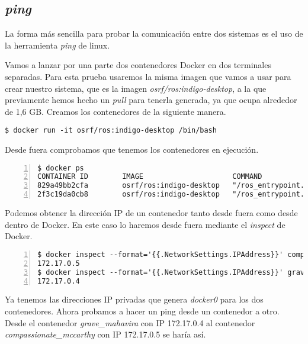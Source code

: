 		\subsection{\textit{ping}}
		La forma más sencilla para probar la comunicación entre dos sistemas es el uso de la herramienta \emph{ping} de linux.
		
		Vamos a lanzar por una parte dos contenedores Docker en dos terminales separadas. Para esta prueba usaremos la misma imagen que vamos a usar para crear nuestro sistema, que es la imagen \emph{osrf/ros:indigo-desktop}, a la que previamente hemos hecho un \emph{pull} para tenerla generada, ya que ocupa alrededor de 1,6 GB. Creamos los contenedores de la siguiente manera.
		
		\begin{lstlisting}[style=consola]
$ docker run -it osrf/ros:indigo-desktop /bin/bash
		\end{lstlisting}
		
		Desde fuera comprobamos que tenemos los contenedores en ejecución.
		
		\begin{lstlisting}[style=consola,numbers=left]
$ docker ps
CONTAINER ID        IMAGE                     COMMAND                  CREATED             STATUS              PORTS               NAMES
829a49bb2cfa        osrf/ros:indigo-desktop   "/ros_entrypoint.sh /"   6 seconds ago       Up 6 seconds                            compassionate_mccarthy
2f3c19da0cb8        osrf/ros:indigo-desktop   "/ros_entrypoint.sh /"   16 seconds ago      Up 16 seconds                           grave_mahavira
		\end{lstlisting}
		
		Podemos obtener la dirección IP de un contenedor tanto desde fuera como desde dentro de Docker. En este caso lo haremos desde fuera mediante el \emph{inspect} de Docker.
		
		\begin{lstlisting}[style=consola,numbers=left]
$ docker inspect --format='{{.NetworkSettings.IPAddress}}' compassionate_mccarthy
172.17.0.5
$ docker inspect --format='{{.NetworkSettings.IPAddress}}' grave_mahavira
172.17.0.4
		\end{lstlisting}
		
		Ya tenemos las direcciones IP privadas que genera \emph{docker0} para los dos contenedores. Ahora probamos a hacer un ping desde un contenedor a otro. Desde el contenedor \textit{grave\_mahavira} con IP 172.17.0.4 al contenedor \textit{compassionate\_mccarthy} con IP 172.17.0.5 se haría así.
		
